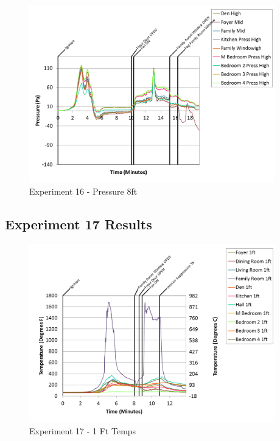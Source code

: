 \documentclass{article}
\begin{document}
\begin{appendices}
\clearpage

\begin{figure}[h!]
	\centering
	\includegraphics[height=3.05in]{0_Images/Results_Charts/Exp_16_Charts/Pressure8ft.png}
	\caption{Experiment 16 - Pressure 8ft}
\end{figure}


\clearpage
\clearpage		\large
\subsection{Experiment 17 Results} \label{App:Exp17Results} 

\begin{figure}[h!]
	\centering
	\includegraphics[height=3.05in]{0_Images/Results_Charts/Exp_17_Charts/1FtTemps.png}
	\caption{Experiment 17 - 1 Ft Temps}
\end{figure}



\end{appendices}
\end{document}

